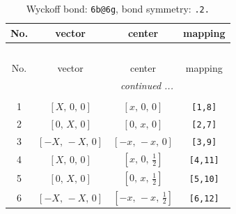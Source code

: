 \documentclass[fleqn,8pt]{jsarticle}
\begin{document}
\begin{longtable}{cccc}
\caption{Wyckoff bond: {\tt 6b@6g}, bond symmetry: {\tt .2.}}
 \\
 \hline \hline
No. & vector & center & mapping \\ \hline \endfirsthead

\multicolumn{3}{l}{\tablename\ \thetable{}} \\
 \hline \hline
No. & vector & center & mapping \\ \hline \endhead

 \hline \hline
\multicolumn{3}{r}{\footnotesize\it continued ...} \\ \endfoot

 \hline \hline
\multicolumn{3}{r}{} \\ \endlastfoot

1 & $\left[ X,\, 0,\, 0 \right]$ & $\left[ x,\, 0,\, 0 \right]$ & {\tt [1,8]} \\ \hline
2 & $\left[ 0,\, X,\, 0 \right]$ & $\left[ 0,\, x,\, 0 \right]$ & {\tt [2,7]} \\ \hline
3 & $\left[ - X,\, - X,\, 0 \right]$ & $\left[ - x,\, - x,\, 0 \right]$ & {\tt [3,9]} \\ \hline
4 & $\left[ X,\, 0,\, 0 \right]$ & $\left[ x,\, 0,\, \frac{1}{2} \right]$ & {\tt [4,11]} \\ \hline
5 & $\left[ 0,\, X,\, 0 \right]$ & $\left[ 0,\, x,\, \frac{1}{2} \right]$ & {\tt [5,10]} \\ \hline
6 & $\left[ - X,\, - X,\, 0 \right]$ & $\left[ - x,\, - x,\, \frac{1}{2} \right]$ & {\tt [6,12]} \\
\end{longtable}
\renewcommand{\arraystretch}{1.2}
\end{document}
